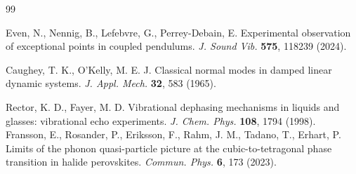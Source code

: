 
\begin{thebibliography}{99}

 Even, N., Nennig, B., Lefebvre, G., Perrey-Debain, E. Experimental observation of exceptional points in coupled pendulums. \textit{J. Sound Vib.} \textbf{575}, 118239 (2024).

 Caughey, T. K., O'Kelly, M. E. J. Classical normal modes in damped linear dynamic systems. \textit{J. Appl. Mech.} \textbf{32}, 583 (1965).

 Rector, K. D., Fayer, M. D. Vibrational dephasing mechanisms in liquids and glasses: vibrational echo experiments. \textit{J. Chem. Phys.} \textbf{108}, 1794 (1998).
 Fransson, E., Rosander, P., Eriksson, F., Rahm, J. M., Tadano, T., Erhart, P. Limits of the phonon quasi-particle picture at the cubic-to-tetragonal phase transition in halide perovskites. \textit{Commun. Phys.} \textbf{6}, 173 (2023).


\end{thebibliography}
